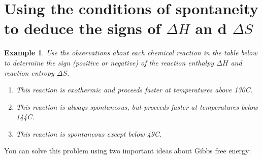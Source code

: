 \documentclass{article}  %
\newtheorem{exmp}{Example}
\begin{document}
\section*{Using the conditions of spontaneity to deduce the signs of $\Delta H$ an d $\Delta S$}
\begin{exmp}
    Use the observations about each chemical reaction in the table below to determine the sign (positive or negative) of the reaction enthalpy $\Delta H$ and reaction entropy $\Delta S$.
    \begin{enumerate}
        \item  This reaction is exothermic and proceeds faster at temperatures above 130C.
        \item  This reaction is always spontaneous, but proceeds faster at temperatures below 144C.
        \item  This reaction is spontaneous except below 49C.
    \end{enumerate}
\end{exmp}
You can solve this problem using two important ideas about Gibbs free energy: 
\end{document}

